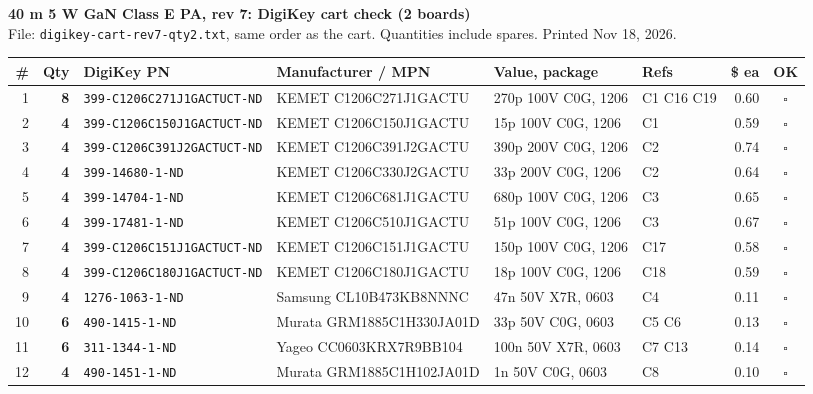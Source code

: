 \documentclass[10pt]{article}
\begin{document}
{\Large\textbf{40 m 5 W GaN Class E PA, rev 7: DigiKey cart check (2 boards)}}\\[2pt]
File: \texttt{digikey-cart-rev7-qty2.txt}, same order as the cart. Quantities include spares. Printed Nov 18, 2026.\\[4pt]
\begin{longtable}{|r|r|>{\raggedright}p{1.9in}|>{\raggedright}p{2.3in}|>{\raggedright}p{1.7in}|>{\raggedright}p{1.15in}|r|c|}
\hline \textbf{\#} & \textbf{Qty} & \textbf{DigiKey PN} & \textbf{Manufacturer / MPN} & \textbf{Value, package} & \textbf{Refs} & \textbf{\$ ea} & \textbf{OK}\\ \hline\endhead
1 & \textbf{8} & \texttt{399-C1206C271J1GACTUCT-ND} & KEMET C1206C271J1GACTU & 270p 100V C0G, 1206 & C1 C16 C19 & 0.60 & $\square$\\ \hline
2 & \textbf{4} & \texttt{399-C1206C150J1GACTUCT-ND} & KEMET C1206C150J1GACTU & 15p 100V C0G, 1206 & C1 & 0.59 & $\square$\\ \hline
3 & \textbf{4} & \texttt{399-C1206C391J2GACTUCT-ND} & KEMET C1206C391J2GACTU & 390p 200V C0G, 1206 & C2 & 0.74 & $\square$\\ \hline
4 & \textbf{4} & \texttt{399-14680-1-ND} & KEMET C1206C330J2GACTU & 33p 200V C0G, 1206 & C2 & 0.64 & $\square$\\ \hline
5 & \textbf{4} & \texttt{399-14704-1-ND} & KEMET C1206C681J1GACTU & 680p 100V C0G, 1206 & C3 & 0.65 & $\square$\\ \hline
6 & \textbf{4} & \texttt{399-17481-1-ND} & KEMET C1206C510J1GACTU & 51p 100V C0G, 1206 & C3 & 0.67 & $\square$\\ \hline
7 & \textbf{4} & \texttt{399-C1206C151J1GACTUCT-ND} & KEMET C1206C151J1GACTU & 150p 100V C0G, 1206 & C17 & 0.58 & $\square$\\ \hline
8 & \textbf{4} & \texttt{399-C1206C180J1GACTUCT-ND} & KEMET C1206C180J1GACTU & 18p 100V C0G, 1206 & C18 & 0.59 & $\square$\\ \hline
9 & \textbf{4} & \texttt{1276-1063-1-ND} & Samsung CL10B473KB8NNNC & 47n 50V X7R, 0603 & C4 & 0.11 & $\square$\\ \hline
10 & \textbf{6} & \texttt{490-1415-1-ND} & Murata GRM1885C1H330JA01D & 33p 50V C0G, 0603 & C5 C6 & 0.13 & $\square$\\ \hline
11 & \textbf{6} & \texttt{311-1344-1-ND} & Yageo CC0603KRX7R9BB104 & 100n 50V X7R, 0603 & C7 C13 & 0.14 & $\square$\\ \hline
12 & \textbf{4} & \texttt{490-1451-1-ND} & Murata GRM1885C1H102JA01D & 1n 50V C0G, 0603 & C8 & 0.10 & $\square$\\ \hline

\end{longtable}
\end{document}

